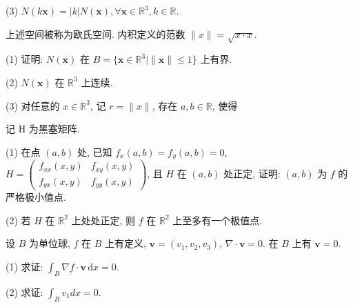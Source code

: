 (3) $N(k\pmb {x}) = |k|N(\pmb {x}),\forall \pmb {x}\in \mathbb{R}^{3},k\in \mathbb{R}.$\par
上述空间被称为欧氏空间. 内积定义的范数 $\| x\| = \sqrt{x\cdot x}$.\par
(1) 证明: $N(\pmb{x})$ 在 $B = \{\pmb{x} \in \mathbb{R}^3 \mid \| \pmb{x} \| \leq 1\}$ 上有界.\par
(2) $N(\pmb{x})$ 在 $\mathbb{R}^3$ 上连续.\par
\par{}
(3) 对任意的 $x \in \mathbb{R}^3$, 记 $r = \| x \|$, 存在 $a, b \in \mathbb{R}$, 使得\par
\nopagebreak[4]
记 H 为黑塞矩阵.\par
(1) 在点 $(a, b)$ 处, 已知 $f_{x}(a, b) = f_{y}(a, b) = 0$, $H = \left( \begin{array}{ll} f_{xx}(x, y) & f_{xy}(x, y) \\ f_{yx}(x, y) & f_{yy}(x, y) \end{array} \right)$, 且 $H$ 在 $(a, b)$ 处正定, 证明: $(a, b)$ 为 $f$ 的严格极小值点.\par
(2) 若 $H$ 在 $\mathbb{R}^2$ 上处处正定, 则 $f$ 在 $\mathbb{R}^2$ 上至多有一个极值点.\par
设 $B$ 为单位球, $f$ 在 $B$ 上有定义, $\pmb{v} = (v_{1}, v_{2}, v_{3})$, $\nabla \cdot \pmb{v} = 0$. 在 $B$ 上有 $\pmb{v} = 0$.\par
(1) 求证: $\int_{B} \nabla f \cdot \boldsymbol{v} \, \mathrm{d}x = 0$.\par
(2) 求证:  $\int_{B} v_{1} dx = 0.$\par
